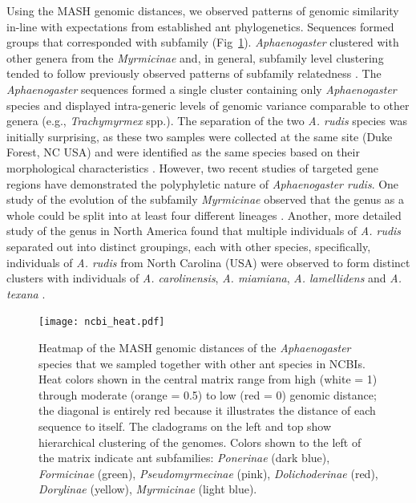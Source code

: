 \documentclass[fleqn,10pt,lineno]{wlpeerj} %
\begin{document}
Using the MASH genomic distances, we observed patterns of genomic
similarity in-line with expectations from established ant
phylogenetics. Sequences formed groups that corresponded with
subfamily (Fig~\ref{fig:all_heat}). \textit{Aphaenogaster} clustered
with other genera from the \textit{Myrmicinae} and, in general,
subfamily level clustering tended to follow previously observed
patterns of subfamily relatedness \citep{Bolton2006, Moreau2006,
  Ward2014}.  The \emph{Aphaenogaster} sequences formed a single
cluster containing only \emph{Aphaenogaster} species and displayed
intra-generic levels of genomic variance comparable to other genera
(e.g., \textit{Trachymyrmex} spp.). The separation of the two
\textit{A. rudis} species was initially surprising, as these two
samples were collected at the same site (Duke Forest, NC USA) and were
identified as the same species based on their morphological
characteristics \citep{Ellison2012, Demarco2016}. However, two recent
studies of targeted gene regions have demonstrated the polyphyletic
nature of \textit{Aphaenogaster rudis}.  One study of the evolution of
the subfamily \textit{Myrmicinae} observed that the genus as a whole
could be split into at least four different lineages
\citep{Ward2015}. Another, more detailed study of the genus in North
America found that multiple individuals of \textit{A. rudis} separated
out into distinct groupings, each with other species, specifically,
individuals of \textit{A. rudis} from North Carolina (USA) were
observed to form distinct clusters with individuals of
\textit{A. carolinensis}, \textit{A. miamiana},
\textit{A. lamellidens} and \textit{A. texana} \citep{Demarco2016}.


\begin{figure}[ht]
\texttt{[image: ncbi\_heat.pdf]}
\caption{Heatmap of the MASH genomic distances of the
  \textit{Aphaenogaster} species that we sampled together with other
  ant species in NCBIs. Heat colors shown in the central matrix range
  from high (white = 1) through moderate (orange = 0.5) to low (red =
  0) genomic distance; the diagonal is entirely red because it
  illustrates the distance of each sequence to itself. The cladograms
  on the left and top show hierarchical clustering of the
  genomes. Colors shown to the left of the matrix indicate ant
  subfamilies:  \emph{Ponerinae} (dark blue), \emph{Formicinae}
  (green), \emph{Pseudomyrmecinae} (pink), \emph{Dolichoderinae}
  (red), \emph{Dorylinae} (yellow), \emph{Myrmicinae} (light blue).}
\label{fig:all_heat}
\end{figure}
\end{document}
